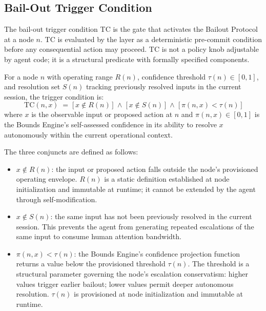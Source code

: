 \subsection{Bail-Out Trigger Condition}
\label{sec:bp-trigger}

The bail-out trigger condition TC is the gate that activates the Bailout Protocol at a node $n$. TC is evaluated by the \fact{} layer as a deterministic pre-commit condition before any consequential action may proceed. TC is not a policy knob adjustable by agent code; it is a structural predicate with formally specified components.

\begin{definition}
\label{def:tc}
For a node $n$ with operating range $R(n)$, confidence threshold $\tau(n) \in [0, 1]$, and resolution set $S(n)$ tracking previously resolved inputs in the current session, the trigger condition is:
\begin{equation}
\text{TC}(n, x)
\;=\;
\bigl[\,x \notin R(n)\,\bigr]
\;\land\;
\bigl[\,x \notin S(n)\,\bigr]
\;\land\;
\bigl[\,\pi(n, x) < \tau(n)\,\bigr]
\tag{TC}
\end{equation}
where $x$ is the observable input or proposed action at $n$ and $\pi(n, x) \in [0, 1]$ is the Bounds Engine's self-assessed confidence in its ability to resolve $x$ autonomously within the current operational context.

The three conjuncts are defined as follows:

\begin{itemize}\itemsep=0pt
\item[\textbf{Bound violation}] $x \notin R(n)$: the input or proposed action falls outside the node's provisioned operating envelope. $R(n)$ is a static definition established at node initialization and immutable at runtime; it cannot be extended by the agent through self-modification.

\item[\textbf{Non-redundancy}] $x \notin S(n)$: the same input has not been previously resolved in the current session. This prevents the agent from generating repeated escalations of the same input to consume human attention bandwidth.

\item[\textbf{Confidence deficit}] $\pi(n, x) < \tau(n)$: the Bounds Engine's confidence projection function returns a value below the provisioned threshold $\tau(n)$. The threshold is a structural parameter governing the node's escalation conservatism: higher values trigger earlier bailout; lower values permit deeper autonomous resolution. $\tau(n)$ is provisioned at node initialization and immutable at runtime.
\end{itemize}
\end{definition}

